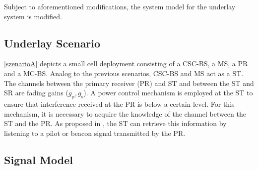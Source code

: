 Subject to aforementioned modifications, the system model for the underlay system is modified. 

\subsection{Underlay Scenario}
\label{scenario}
\figurename\ref{szenarioA} depicts a small cell deployment consisting of a CSC-BS, a MS, a PR and a MC-BS. Analog to the previous scenarios, CSC-BS and MS act as a ST. The channels between the primary receiver (PR) and ST and between the ST and SR are fading gains ($g_\textrm{p}, g_\textrm{s}$). A power control mechanism is employed at the ST to ensure that interference received at the PR is below a certain level. For this mechanism, it is necessary to acquire the knowledge of the channel between the ST and the PR. As proposed in \cite{Kaushik15}, the ST can retrieve this information by listening to a pilot or beacon signal transmitted by the PR. %

\subsection{Signal Model}

